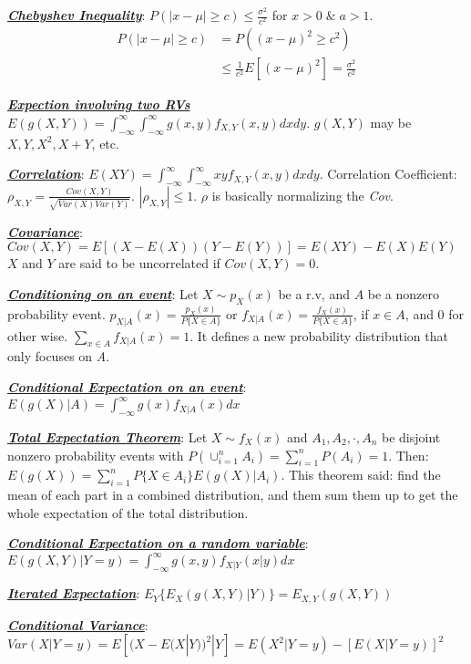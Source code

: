 \documentclass[12pt]{article}
\newcommand{\bulletPoint}[1]{\ul{\textit{\textbf{#1}}}}
\begin{document}
\begin{multicols*}{4}
\bulletPoint{Chebyshev Inequality}: $P(|x-\mu|\geq c) \leq \frac{\sigma^2}{c^2}$ for $x>0 \; \& \; a>1$.
\useshortskip \begin{equation*}
    \begin{split}
        P(|x-\mu| \geq c) & = P((x-\mu)^2 \geq c^2) \\
        & \leq \frac{1}{c^2} E[(x-\mu)^2] = \frac{\sigma^2}{c^2}
    \end{split}
\end{equation*}


\bulletPoint{Expection involving two RVs}
$E(g(X, Y)) = \int^\infty_{-\infty}\int^\infty_{-\infty}g(x,y)f_{X,Y}(x,y)dxdy$. $g(X, Y)$ may be $X, Y, X^2, X+Y$, etc.


\bulletPoint{Correlation}: $E(XY) = \int^\infty_{-\infty}\int^\infty_{-\infty}xyf_{X,Y}(x,y)dxdy$.
Correlation Coefficient: $\rho_{X,Y} = \frac{Cov(X,Y)}{\sqrt{Var(X)Var(Y)}}$. $|\rho_{X,Y}| \leq 1$. $\rho$ is basically normalizing the \textit{Cov}.


\bulletPoint{Covariance}: $Cov(X, Y) = E[(X - E(X))(Y - E(Y))] = E(XY) - E(X)E(Y)$ $X$ and $Y$ are said to be uncorrelated if $Cov(X,Y)=0$. 


\bulletPoint{Conditioning on an event}: Let $X \sim p_X(x)$ be a r.v, and $A$ be a nonzero probability event. $p_{X|A}(x) = \frac{p_X(x)}{P\{ X \in A\}}$ or $f_{X|A}(x) = \frac{f_X(x)}{P\{ X \in A\}}$,  if $x \in A$, and 0 for other wise. $\sum_{x \in A}f_{X|A}(x)=1$. It defines a new probability distribution that only focuses on \textit{A}. 


\bulletPoint{Conditional Expectation on an event}: $E(g(X)|A) = \int^\infty_{-\infty}g(x)f_{X|A}(x)dx$


\bulletPoint{Total Expectation Theorem}: Let $X \sim f_X(x)$ and $A_1, A_2, \cdot, A_n$ be disjoint nonzero probability events with $P(\cup^n_{i=1}A_i) = \sum^n_{i=1}P(A_i)=1$. Then: $E(g(X)) = \sum^n_{i=1}P\{ X \in A_i \} E(g(X)|A_i)$. This theorem said: find the mean of each part in a combined distribution, and them sum them up to get the whole expectation of the total distribution.


\bulletPoint{Conditional Expectation on a random variable}: \\
$E(g(X, Y)|Y=y) = \int^\infty_{-\infty}g(x,y)f_{X|Y}(x|y)dx$


\bulletPoint{Iterated Expectation}: $E_Y\{ E_X(g(X,Y)|Y)\} = E_{X,Y}(g(X, Y))$


\bulletPoint{Conditional Variance}: $Var(X|Y=y) = E[(X-E(X|Y))^2|Y] = E(X^2|Y=y) - [E(X|Y=y)]^2$



\end{multicols*}
\end{document}
